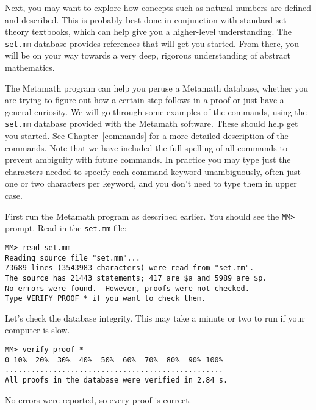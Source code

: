 Next, you may want to explore how concepts such as natural numbers are
defined and described.  This is probably best done in conjunction with
standard set theory textbooks, which can help give you a higher-level
understanding.  The \texttt{set.mm} database provides references that will get
you started.  From there, you will be on your way towards a very deep,
rigorous understanding of abstract mathematics.

The Metamath program can help you peruse a Metamath data\-base,
wheth\-er you are trying to figure out how a certain step follows in a proof or
just have a general curiosity.  We will go through some examples of the
commands, using the \texttt{set.mm}
database provided with the Metamath software.  These should help get you
started.  See Chapter~\ref{commands} for a more detailed description of
the commands.  Note that we have included the full spelling of all commands to
prevent ambiguity with future commands.  In practice you may type just the
characters needed to specify each command keyword
unambiguously, often just one or two characters per keyword, and you don't
need to type them in upper
case.

First run the Metamath program as described earlier.  You should see the
\verb/MM>/ prompt.  Read in the \texttt{set.mm} file:

\begin{verbatim}
MM> read set.mm
Reading source file "set.mm"...
73689 lines (3543983 characters) were read from "set.mm".
The source has 21443 statements; 417 are $a and 5989 are $p.
No errors were found.  However, proofs were not checked.
Type VERIFY PROOF * if you want to check them.
\end{verbatim}

Let's check the database integrity.  This may take a minute or two to run if
your computer is slow.

\begin{verbatim}
MM> verify proof *
0 10%  20%  30%  40%  50%  60%  70%  80%  90% 100%
..................................................
All proofs in the database were verified in 2.84 s.
\end{verbatim}

No errors were reported, so every proof is correct.

